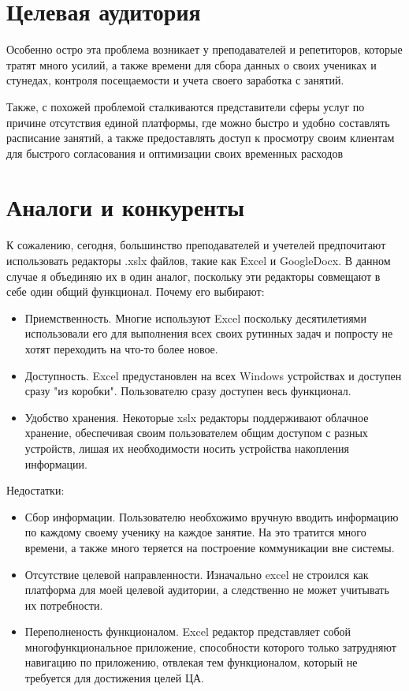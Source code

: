 \documentclass[14pt, timesnewroman]{article}
\begin{document}
\section{Целевая аудитория}
Особенно остро эта проблема возникает у преподавателей и репетиторов, которые тратят много усилий, а также времени для сбора данных о своих учениках и стунедах, контроля посещаемости и учета своего заработка с занятий.

Также, с похожей проблемой сталкиваются представители сферы услуг по причине отсутствия единой платформы, где можно быстро и удобно составлять расписание занятий, а также предоставлять доступ к просмотру своим клиентам для быстрого согласования и оптимизации своих временных расходов

\section{Аналоги и конкуренты}

К сожалению, сегодня, большинство преподавателей и учетелей предпочитают использовать редакторы .xslx файлов, такие как Excel и GoogleDocx. В данном случае я объединяю их в один аналог, поскольку эти редакторы совмещают в себе один общий функционал.
Почему его выбирают:
\begin{itemize}
    \item Приемственность. Многие используют Excel поскольку десятилетиями использовали его для выполнения всех своих рутинных задач и попросту не хотят переходить на что-то более новое.
    \item Доступность. Excel предустановлен на всех Windows устройствах и доступен сразу "из коробки". Пользователю сразу доступен весь функционал.
    \item Удобство хранения. Некоторые xslx редакторы поддерживают облачное хранение, обеспечивая своим пользователем общим доступом с разных устройств, лишая их необходимости носить устройства накопления информации.
\end{itemize}
Недостатки:
\begin{itemize}
    \item Сбор информации. Пользователю необхожимо вручную вводить информацию по каждому своему ученику на каждое занятие. На это тратится много времени, а также много теряется на построение коммуникации вне системы.
    \item Отсутствие целевой направленности. Изначально excel не строился как платформа для моей целевой аудитории, а следственно не может учитывать их потребности. 
    \item Переполненость функционалом. Excel редактор представляет собой многофункциональное приложение, способности которого только затрудняют навигацию по приложению, отвлекая тем функционалом, который не требуется для достижения целей ЦА.
\end{itemize}
\end{document}
